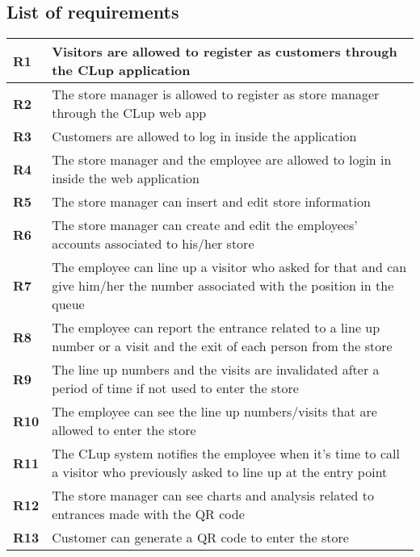 \subsection{List of requirements}
    \begin{center}
        {\renewcommand{\arraystretch}{2}
        \begin{longtable}{L{2cm}L{12cm}}
            \hline
            \textbf{R1} & Visitors are allowed to register as customers through the CLup application \\
            \hline
            \textbf{R2} & The store manager is allowed to register as store manager through the CLup web app \\
            \hline
            \textbf{R3} & Customers are allowed to log in inside the application \\
            \hline
            \textbf{R4} & The store manager and the employee are allowed to login in inside the web application \\
            \hline
            \textbf{R5} & The store manager can insert and edit store information \\
            \hline
            \textbf{R6} & The store manager can create and edit the employees' accounts associated to his/her store \\
            \hline
            \textbf{R7} & The employee can line up a visitor who asked for that and can give him/her the number associated with the position in the queue \\
            \hline
            \textbf{R8} & The employee can report the entrance related to a line up number or a visit and the exit of each person from the store \\
            \hline
            \textbf{R9} & The line up numbers and the visits are invalidated after a period of time if not used to enter the store \\
            \hline
            \textbf{R10} & The employee can see the line up numbers/visits that are allowed to enter the store \\
            \hline
            \textbf{R11} & The CLup system notifies the employee when it's time to call a visitor who previously asked to line up at the entry point \\
            \hline
            \textbf{R12} & The store manager can see charts and analysis related to entrances made with the QR code \\
            \hline
            \textbf{R13} & Customer can generate a QR code to enter the store \\

\end{longtable}}
\end{center}
